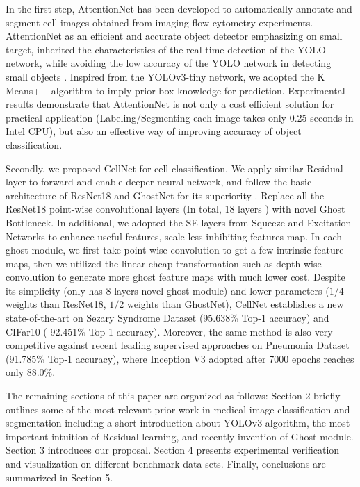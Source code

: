 In the first step, AttentionNet has been developed to automatically annotate and segment cell images obtained from imaging flow cytometry experiments. AttentionNet as an efficient and accurate object detector emphasizing on small target, inherited the characteristics of the real-time detection of the YOLO network, while avoiding the low accuracy of the YOLO network in detecting small objects \cite{b33}. Inspired from the YOLOv3-tiny network\cite{b18}, we adopted the K Means++ algorithm to imply prior box knowledge for prediction. Experimental results demonstrate that AttentionNet is not only a cost efficient solution for practical application (Labeling/Segmenting each image takes only 0.25 seconds in Intel CPU), but also an effective way of improving accuracy of object classification. 

Secondly, we proposed CellNet for cell classification. We apply similar Residual layer to forward and enable deeper neural network, and follow the basic architecture of ResNet18 and GhostNet for its superiority \cite{b19}\cite{b20}. Replace all the ResNet18 \cite{b20} point-wise convolutional layers (In total, 18 layers ) with novel Ghost Bottleneck. In additional, we adopted the SE layers from Squeeze-and-Excitation Networks \cite{b24} to enhance useful features, scale less inhibiting features map. In each ghost module, we first take point-wise convolution to get a few intrinsic feature maps, then we utilized the linear cheap transformation such as depth-wise convolution to generate more ghost feature maps with much lower cost.
Despite its simplicity (only has 8 layers novel ghost module) and lower parameters ($1/4$ weights than ResNet18\cite{b20}, $1/2$ weights than GhostNet\cite{b19}), CellNet establishes a new state-of-the-art on Sezary Syndrome Dataset (95.638\% Top-1 accuracy) and CIFar10\cite{b21} ( 92.451\% Top-1 accuracy). Moreover, the same method is also very competitive against recent leading supervised approaches on Pneumonia Dataset (91.785\% Top-1 accuracy), where Inception V3 adopted after 7000 epochs reaches only 88.0\%\cite{b38}. 

The remaining sections of this paper are organized as follows: Section 2 briefly outlines some of the most relevant  prior work in medical image classification and segmentation including a short introduction about YOLOv3 \cite{b33} algorithm, the most important intuition of Residual learning, and recently invention of Ghost module.
Section 3 introduces our proposal. Section 4 presents experimental verification  and visualization on different benchmark data sets. Finally, conclusions are summarized in Section 5.

